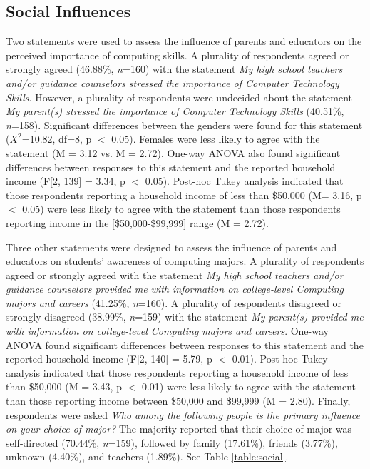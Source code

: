 \documentclass{article}
\begin{document}
\subsection{Social Influences}
Two statements were used to assess the influence of parents and educators on the perceived importance of computing skills. A plurality of respondents agreed or strongly agreed (46.88\%, \textit{n}=160) with the statement \textit{My high school teachers and/or guidance counselors stressed the importance of Computer Technology Skills}. However, a plurality of respondents were undecided about the statement \textit{My parent(s) stressed the importance of Computer Technology Skills} (40.51\%, \textit{n}=158). Significant differences between the genders were found for this statement ($X^2$=10.82, df=8, p $<$ 0.05). Females were less likely to agree with the statement (M = 3.12 vs. M = 2.72). One-way ANOVA also found significant differences between responses to this statement and the reported household income (F[2, 139] = 3.34, p $<$ 0.05). Post-hoc Tukey analysis indicated that those respondents reporting a household income of less than \$50,000 (M= 3.16, p $<$ 0.05) were less likely to agree with the statement than those respondents reporting income in the [\$50,000-\$99,999] range (M = 2.72).

Three other statements were designed to assess the influence of parents and educators on students’ awareness of computing majors. A plurality of respondents agreed or strongly agreed with the statement \textit{My high school teachers and/or guidance counselors provided me with information on college-level Computing majors and careers} (41.25\%, \textit{n}=160). A plurality of respondents disagreed or strongly disagreed (38.99\%, \textit{n}=159) with the statement \textit{My parent(s) provided me with information on college-level Computing majors and careers}. One-way ANOVA found significant differences between responses to this statement and the reported household income (F[2, 140] = 5.79, p $<$ 0.01). Post-hoc Tukey analysis indicated that those respondents reporting a household income of less than \$50,000 (M = 3.43, p $<$ 0.01) were less likely to agree with the statement than those reporting income between \$50,000 and \$99,999 (M = 2.80). Finally, respondents were asked \textit{Who among the following people is the primary influence on your choice of major?} The majority reported that their choice of major was self-directed (70.44\%, \textit{n}=159), followed by family (17.61\%), friends (3.77\%), unknown (4.40\%), and teachers (1.89\%). See Table \ref{table:social}.
\end{document}
